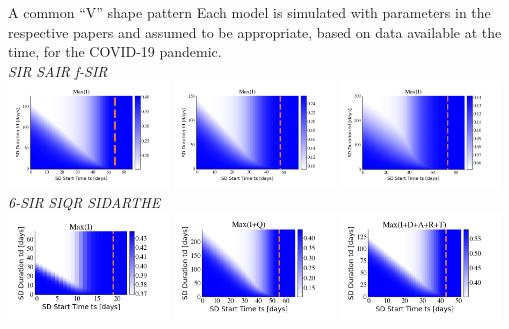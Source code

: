\documentclass[10pt]{beamer}
\begin{document}
\begin{frame}{A common ``V'' shape pattern}
	Each model is simulated with parameters in the respective papers and assumed to be appropriate, based on data available at the time, for the COVID-19 pandemic.\\  \vspace{0.5cm}
	\hspace{1cm}  \textit{SIR} \hspace{2.5cm} \textit{SAIR} \hspace{2.1cm} \textit{f-SIR} \\
	\includegraphics[width=0.32\textwidth]{epidemic-sir-heatmap.png}
	\includegraphics[width=0.32\textwidth]{epidemic-sair.png}
	\includegraphics[width=0.32\textwidth]{epidemic-fsir.png}\\
	\hspace{0.8cm}  \textit{6-SIR} \hspace{2.3cm} \textit{SIQR} \hspace{1.8cm} \textit{SIDARTHE} \\
	\includegraphics[width=0.32\textwidth]{epidemic-sixsir.png}
	\includegraphics[width=0.32\textwidth]{epidemic-siqr.png}
	\includegraphics[width=0.32\textwidth]{epidemic-sidarthe.png}
\end{frame}
\end{document}
